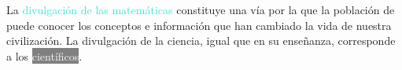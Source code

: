 \documentclass{article}
\begin{document}
La \textcolor{Turquoise}{divulgación de las matemáticas} constituye una vía
por la que la población de 
 puede conocer
los conceptos e información que han cambiado la vida de nuestra civilización.
{\color{Red} La divulgación de la ciencia, igual que en su enseñanza,
corresponde a los \colorbox{Gray}{\textcolor{White}{científicos}}.}
\end{document}
